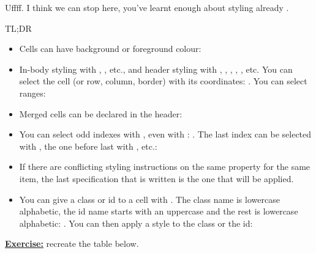 Uffff. I think we can stop here, you've learnt enough about styling already .

\begin{infobox}{TL;DR}
\begin{itemize}
	\item Cells can have background or foreground colour: 
	\item In-body styling with , , etc., and header styling with , , , , , etc. You can select the cell (or row, column, border) with its coordinates: . You can select ranges: 
	\item Merged cells can be declared in the header: 
	\item You can select odd indexes with , even with : . The last index can be selected with , the one before last with , etc.: 
	\item If there are conflicting styling instructions on the same property for the same item, the last specification that is written is the one that will be applied.
	\item You can give a class or id to a cell with . The class name is lowercase alphabetic, the id name starts with an uppercase and the rest is lowercase alphabetic: . You can then apply a style to the class or the id: 
\end{itemize}

\textbf{\underline{Exercise:}} recreate the table below.


\end{infobox}
